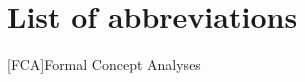 \section*{List of abbreviations}

\begin{acronym}[XXXXXXXXX]
    [FCA]{Formal Concept Analyses}
\end{acronym}